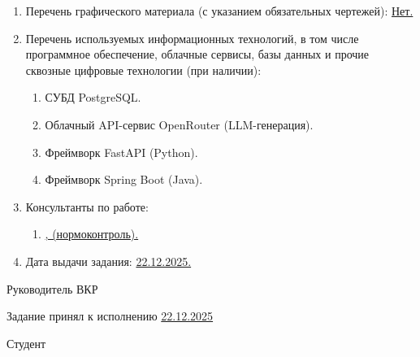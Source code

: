 \begin{enumerate}[1.]
\begin{enumerate}[label=\theenumi\arabic*.]
		\item Проектирование архитектуры системы (iOS-клиент, backend, RAG-пайплайн, БД).
		\item Разработка и интеграция модулей приложения.
		\item Тестирование работоспособности системы.
	\end{enumerate}
	\item Перечень графического материала (с указанием обязательных чертежей): \uline{Нет.}
	\item Перечень используемых информационных технологий, в том числе программное обеспечение, облачные сервисы, базы данных и прочие сквозные цифровые технологии (при наличии):
	\begin{enumerate}[label=\theenumi\arabic*.]
		\item СУБД PostgreSQL.
		\item Облачный API-сервис OpenRouter (LLM-генерация).
		\item Фреймворк FastAPI (Python).
		\item Фреймворк Spring Boot (Java).
	\end{enumerate}
	\item Консультанты по работе:
	\begin{enumerate}[label=\theenumi\arabic*.]
		\item \uline{\emakefirstuc{\ConsultantNormDegree}, \ConsultantNorm{} (нормоконтроль).}
	\end{enumerate}
	\item Дата выдачи задания: \uline{22.12.2025.}
\end{enumerate}

\intervalS%

Руководитель ВКР \uline{\hspace*{0.1\textheight} \Supervisor}


\intervalS%


Задание принял к исполнению \uline{22.12.2025}

\intervalS%

Студент \uline{\hspace*{0.1\textheight}  \Author}



